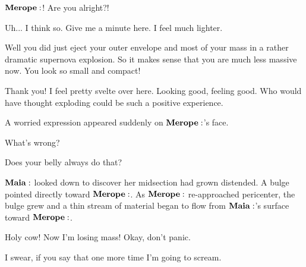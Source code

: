 \documentclass[main.tex]{subfiles}
\begin{document}
\Maia $\Merope$! Are you alright?!  

\Merope Uh... I think so.  Give me a minute here.  I feel much lighter.

\Maia Well you did just eject your outer envelope and most of your mass in a rather dramatic supernova explosion.  So it makes sense that you are much less massive now.  You look so small and compact!  

\Merope Thank you!  I feel pretty svelte over here.  Looking good, feeling good.  Who would have thought exploding could be such a positive experience.

A worried expression appeared suddenly on $\Merope$'s face.

\Maia What's wrong?

\Merope Does your belly always do that?

$\Maia$ looked down to discover her midsection had grown distended.  A bulge pointed directly toward $\Merope$.  As $\Merope$ re-approached pericenter, the bulge grew and a thin stream of material began to flow from $\Maia$'s surface toward $\Merope$.

\Maia Holy cow!  Now I'm losing mass! Okay, don't panic.

\Merope I swear, if you say that one more time I'm going to scream.
\end{document}
